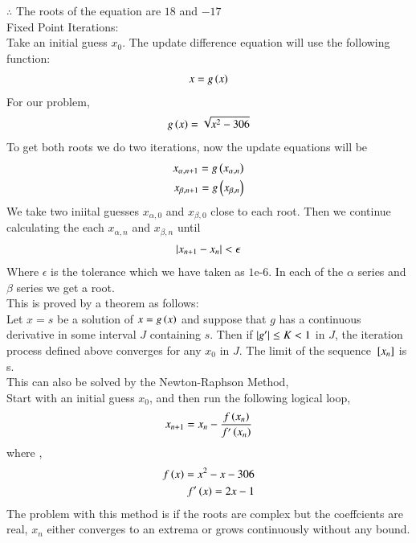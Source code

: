 \documentclass[journal]{IEEEtran}
\begin{document}
$\therefore$ The roots of the equation are $18$ and $-17$\\
Fixed Point Iterations:\\
Take an initial guess $x_0$. The update difference equation will use the following function:
\begin{align}
    x = g\left(x\right)
\end{align}
For our problem,
\begin{align}
    g\left(x\right) = \sqrt{x^2-306}
\end{align}
To get both roots we do two iterations, now the update equations will be
\begin{align}
    x_{\alpha,n+1}=g\left(x_{\alpha,n}\right)\\
    x_{\beta,n+1}=g\left(x_{\beta,n}\right)\\
\end{align}
We take two iniital guesses $x_{\alpha,0}$ and $x_{\beta,0}$ close to each root. Then we continue calculating the each $x_{\alpha,n}$ and $x_{\beta,n}$ until
\begin{align}
    \left\vert x_{n+1}-x_n\right\vert<\epsilon
\end{align}
Where $\epsilon$ is the tolerance which we have taken as $1\text{e-}6$. In each of the $\alpha$ series and $\beta$ series we get a root.\\
\newline
This is proved by a theorem as follows:\\
Let $x = s$ be a solution of $x = g\left(x\right)$ and suppose that $g$ has a continuous
derivative in some interval $J$ containing $s$. Then if $\left\vert g^{\prime}\right\vert \le K < 1$ in $J$,
the iteration process defined  above converges for any $x_0$ in $J$. The limit of the sequence
${}\left[x_n\right]$ is s.\\
\newline
This can also be solved by the Newton-Raphson Method,\\
Start with an initial guess $x_0$, and then run the following logical loop,
\begin{align}
    x_{n+1} = x_n - \frac{f\left(x_n\right)}{f^{\prime}\left(x_n\right)} 
\end{align}
where ,
\begin{align}
    f\left(x\right) = x^2 - x - 306\\
    f^{\prime}\left(x\right) = 2x-1
\end{align}
\newline
The problem with this method is if the roots are complex but the coeffcients are real, $x_n$ either converges to an extrema or grows continuously without any bound.
\end{document}
